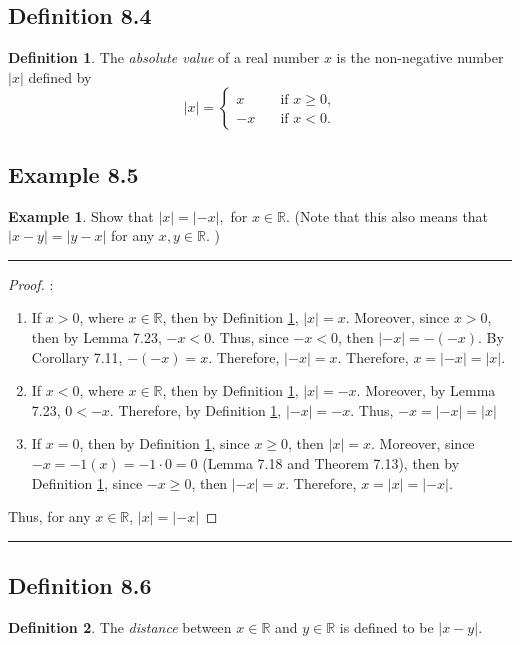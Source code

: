 \documentclass[openany, amssymb, psamsfonts]{amsart}
\newcommand{\bbR}{\mathbb{R}}
\newcommand{\abs}[1]{\lvert #1 \rvert}
\theoremstyle{definition}
\newtheorem{defn}{Definition}[section]
\newtheorem{exmp}{Example}[section]
\numberwithin{equation}{section}
\begin{document}
\subsection*{Definition 8.4}
\begin{defn}
\label{8.4}
	The \emph{absolute value} of a real number $x$ is the non-negative number $\abs{x}$ defined by
	\[
		\abs{x} = \begin{cases}
			x \quad &\text{if $x \geq 0$,} \\
			-x \quad &\text{if $x < 0$.} 
		\end{cases}
	\]
\end{defn}

\subsection*{Example 8.5}
\begin{exmp}
\label{8.5}
Show that $\abs{x}=\abs{-x},$ for $x\in \bbR.$  (Note that this also means that $\abs{x-y}=\abs{y-x}$ for any $x,y\in \bbR.$ )
\end{exmp}
\vspace{4pt}     \hrule   \vspace{4pt}
\begin{proof}:\\
\begin{enumerate}
    \item If $x>0$, where $x\in \bbR$, then by Definition \ref{8.4}, $\abs{x} = x$. Moreover, since $x> 0$, then by Lemma 7.23, $-x<0$. Thus, since $-x<0$, then $\abs{-x} = -(-x)$. By Corollary 7.11, $-(-x) = x$. Therefore, $\abs{-x} = x$. Therefore, $x = |-x| = |x|$.
    \item If $x< 0$, where $x\in \bbR$, then by Definition \ref{8.4}, $\abs{x} = -x$. Moreover, by Lemma 7.23, $0<-x$. Therefore, by Definition \ref{8.4}, $\abs{-x}=-x$. Thus, $-x = |-x| = |x|$
    \item If $x=0$, then by Definition \ref{8.4}, since $x\geq 0$, then $\abs{x} = x$. Moreover, since $-x = -1(x) = -1 \cdot 0 = 0$ (Lemma 7.18 and Theorem 7.13), then by Definition \ref{8.4}, since $-x\geq 0$, then $\abs{-x} = x$. Therefore, $x = |x| = |-x|$.
\end{enumerate}
Thus, for any $x\in \bbR$, $\abs{x}=\abs{-x}$
\end{proof} \vspace{4pt}     \hrule   \vspace{4pt}

\subsection*{Definition 8.6}
\begin{defn} 
\label{8.6}
	\label{defn:distance}
	The \emph{distance} between $x \in \bbR$ and $y \in \bbR$ is defined to be $\abs{x - y}$. 
\end{defn}
\end{document}
